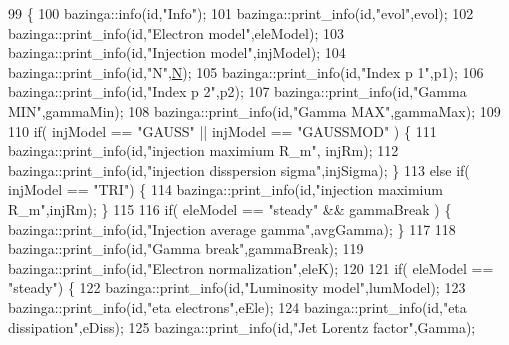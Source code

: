 \begin{DoxyCode}
99                            \{
100   bazinga::info(\textcolor{keywordtype}{id},\textcolor{stringliteral}{"Info"});
101   bazinga::print\_info(\textcolor{keywordtype}{id},\textcolor{stringliteral}{"evol"},evol);
102   bazinga::print\_info(\textcolor{keywordtype}{id},\textcolor{stringliteral}{"Electron model"},eleModel);
103   bazinga::print\_info(\textcolor{keywordtype}{id},\textcolor{stringliteral}{"Injection model"},injModel);
104   bazinga::print\_info(\textcolor{keywordtype}{id},\textcolor{stringliteral}{"N"},\hyperlink{classbaseClass_a2b4d07d2b46197d495de0477f4bb22f8}{N});
105   bazinga::print\_info(\textcolor{keywordtype}{id},\textcolor{stringliteral}{"Index p 1"},p1);
106   bazinga::print\_info(\textcolor{keywordtype}{id},\textcolor{stringliteral}{"Index p 2"},p2);
107   bazinga::print\_info(\textcolor{keywordtype}{id},\textcolor{stringliteral}{"Gamma MIN"},gammaMin);
108   bazinga::print\_info(\textcolor{keywordtype}{id},\textcolor{stringliteral}{"Gamma MAX"},gammaMax);
109   
110   \textcolor{keywordflow}{if}( injModel == \textcolor{stringliteral}{"GAUSS"} || injModel == \textcolor{stringliteral}{"GAUSSMOD"} ) \{
111     bazinga::print\_info(\textcolor{keywordtype}{id},\textcolor{stringliteral}{"injection maximium R\_m"}, injRm);
112     bazinga::print\_info(\textcolor{keywordtype}{id},\textcolor{stringliteral}{"injection disspersion sigma"},injSigma); \}
113   \textcolor{keywordflow}{else} \textcolor{keywordflow}{if}( injModel == \textcolor{stringliteral}{"TRI"}) \{
114     bazinga::print\_info(\textcolor{keywordtype}{id},\textcolor{stringliteral}{"injection maximium R\_m"},injRm); \}
115   
116   \textcolor{keywordflow}{if}( eleModel == \textcolor{stringliteral}{"steady"} && gammaBreak ) \{ bazinga::print\_info(\textcolor{keywordtype}{id},\textcolor{stringliteral}{"Injection average gamma"},avgGamma); \}
117   
118   bazinga::print\_info(\textcolor{keywordtype}{id},\textcolor{stringliteral}{"Gamma break"},gammaBreak);
119   bazinga::print\_info(\textcolor{keywordtype}{id},\textcolor{stringliteral}{"Electron normalization"},eleK);
120 
121   \textcolor{keywordflow}{if}( eleModel == \textcolor{stringliteral}{"steady"}) \{
122     bazinga::print\_info(\textcolor{keywordtype}{id},\textcolor{stringliteral}{"Luminosity model"},lumModel);
123     bazinga::print\_info(\textcolor{keywordtype}{id},\textcolor{stringliteral}{"eta electrons"},eEle);
124     bazinga::print\_info(\textcolor{keywordtype}{id},\textcolor{stringliteral}{"eta dissipation"},eDiss);
125     bazinga::print\_info(\textcolor{keywordtype}{id},\textcolor{stringliteral}{"Jet Lorentz factor"},Gamma);

\end{DoxyCode}
